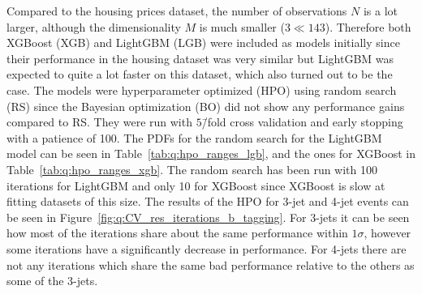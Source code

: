 Compared to the housing prices dataset, the number of observations $N$ is a lot larger, although the dimensionality $M$ is much smaller ($3 \ll 143 $). Therefore both XGBoost (XGB) and LightGBM (LGB) were included as models initially since their performance in the housing dataset was very similar but LightGBM was expected to quite a lot faster on this dataset, which also turned out to be the case. The models were hyperparameter optimized (HPO) using random search (RS) since the Bayesian optimization (BO) did not show any performance gains compared to RS. They were run with $5$\=/fold cross validation and early stopping with a patience of \num{100}. The PDFs for the random search for the LightGBM model can be seen in Table~\ref{tab:q:hpo_ranges_lgb}, and the ones for XGBoost in Table~\ref{tab:q:hpo_ranges_xgb}. The random search has been run with \num{100} iterations for LightGBM and only \num{10} for XGBoost since XGBoost is slow at fitting datasets of this size. The results of the HPO for 3-jet and 4-jet events can be seen in Figure~\ref{fig:q:CV_res_iterations_b_tagging}. For 3-jets it can be seen how most of the iterations share about the same performance within $1\sigma$, however some iterations have a significantly decrease in performance. For 4-jets there are not any iterations which share the same bad performance relative to the others as some of the 3-jets. 

